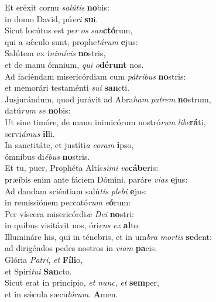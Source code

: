 \evenverse Et eréxit cornu \textit{sa}\textit{lú}\textit{tis} \textbf{no}bis:~\*\\
\evenverse in domo David, pú\textit{e}\textit{ri} \textbf{su}i.\\
\oddverse Sicut locútus est \textit{per} \textit{os} \textit{san}\textbf{ctó}rum,~\*\\
\oddverse qui a sǽculo sunt, prophe\textit{tá}\textit{rum} \textbf{e}jus:\\
\evenverse Salútem ex i\textit{ni}\textit{mí}\textit{cis} \textbf{no}stris,~\*\\
\evenverse et de manu ómnium, \textit{qui} \textit{o}\textbf{dé}\textbf{runt} nos.\\
\oddverse Ad faciéndam misericórdiam cum \textit{pá}\textit{tri}\textit{bus} \textbf{no}stris:~\*\\
\oddverse et memorári testaménti \textit{su}\textit{i} \textbf{san}cti.\\
\evenverse Jusjurándum, quod jurávit ad Abra\textit{ham} \textit{pa}\textit{trem} \textbf{no}strum,~\*\\
\evenverse datú\textit{rum} \textit{se} \textbf{no}bis:\\
\oddverse Ut sine timóre, de manu inimicórum nostró\textit{rum} \textit{li}\textit{be}\textbf{rá}ti,~\*\\
\oddverse servi\textit{á}\textit{mus} \textbf{il}li.\\
\evenverse In sanctitáte, et justíti\textit{a} \textit{co}\textit{ram} \textbf{i}pso,~\*\\
\evenverse ómnibus di\textit{é}\textit{bus} \textbf{no}stris.\\
\oddverse Et tu, puer, Prophéta Altís\textit{si}\textit{mi} \textit{vo}\textbf{cá}\textbf{be}ris:~\*\\
\oddverse præíbis enim ante fáciem Dómini, paráre \textit{vi}\textit{as} \textbf{e}jus:\\
\evenverse Ad dandam sciéntiam salú\textit{tis} \textit{ple}\textit{bi} \textbf{e}jus:~\*\\
\evenverse in remissiónem peccató\textit{rum} \textit{e}\textbf{ó}rum:\\
\oddverse Per víscera misericórdi\textit{æ} \textit{De}\textit{i} \textbf{no}stri:~\*\\
\oddverse in quibus visitávit nos, óri\textit{ens} \textit{ex} \textbf{al}to:\\
\evenverse Illumináre his, qui in ténebris, et in um\textit{bra} \textit{mor}\textit{tis} \textbf{se}dent:~\*\\
\evenverse ad dirigéndos pedes nostros in \textit{vi}\textit{am} \textbf{pa}cis.\\
\oddverse Glória \textit{Pa}\textit{tri}, \textit{et} \textbf{Fí}\textbf{li}o,~\*\\
\oddverse et Spirí\textit{tu}\textit{i} \textbf{San}cto.\\
\evenverse Sicut erat in princípio, \textit{et} \textit{nunc}, \textit{et} \textbf{sem}per,~\*\\
\evenverse et in sǽcula sæcu\textit{ló}\textit{rum}. \textbf{A}men.\\
